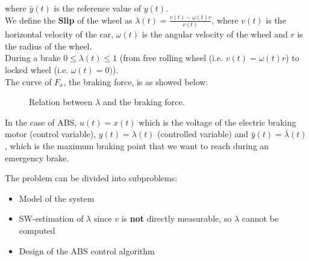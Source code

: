 where $\bar{y}(t)$ is the reference value of $y(t)$.\\

We define the \textbf{Slip} of the wheel as $\lambda(t) = \frac{v(t)-\omega(t) r}{v(t)}$, where $v(t)$ is the horizontal velocity of the car, $\omega(t)$ is the angular velocity of the wheel and $r$ is the radius of the wheel.\\

During a brake $0 \le \lambda (t) \le 1$ (from free rolling wheel (i.e. $v(t) = \omega (t) r$) to locked wheel (i.e. $\omega(t) = 0)$).\\
The curve of $F_{x}$, the braking force, is as showed below:
\vspace{-3cm}
\begin{figure}[h!]
    \centering
    \caption*{Relation between $\lambda$ and the braking force.}
\end{figure}


In the case of ABS, $u(t) = x(t)$ which is the voltage of the electric braking motor (control variable), $y(t) = \lambda (t)$ (controlled variable) and $\bar{y}(t) = \bar{\lambda} (t)$, which is the maximum braking point that we want to reach during an emergency brake.

The problem can be divided into subproblems:
\begin{itemize}
    \item Model of the system
    \item SW-estimation of $\lambda$ since $v$ is \textbf{not} directly measurable, so $\lambda$ cannot be computed
    \item Design of the ABS control algorithm
\end{itemize}

